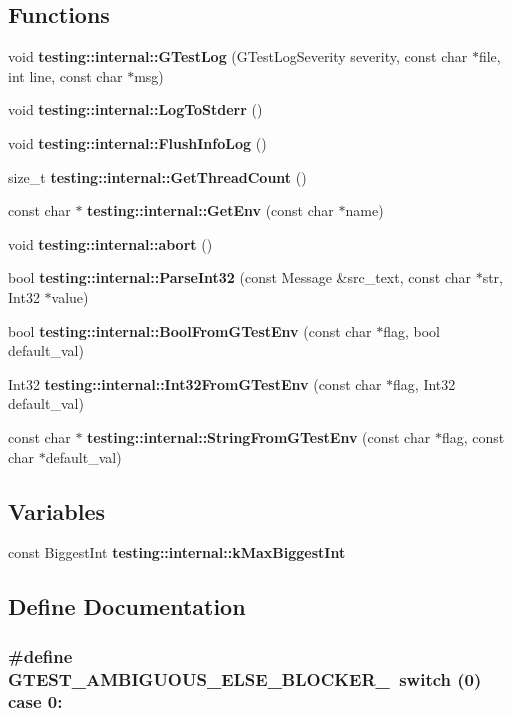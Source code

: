 \subsection*{Functions}
\begin{CompactItemize}
\item 
void {\bf testing::internal::GTestLog} (GTestLogSeverity severity, const char $\ast$file, int line, const char $\ast$msg)
\item 
void {\bf testing::internal::LogToStderr} ()
\item 
void {\bf testing::internal::FlushInfoLog} ()
\item 
size\_\-t {\bf testing::internal::GetThreadCount} ()
\item 
const char $\ast$ {\bf testing::internal::GetEnv} (const char $\ast$name)
\item 
void {\bf testing::internal::abort} ()
\item 
bool {\bf testing::internal::ParseInt32} (const Message \&src\_\-text, const char $\ast$str, Int32 $\ast$value)
\item 
bool {\bf testing::internal::BoolFromGTestEnv} (const char $\ast$flag, bool default\_\-val)
\item 
Int32 {\bf testing::internal::Int32FromGTestEnv} (const char $\ast$flag, Int32 default\_\-val)
\item 
const char $\ast$ {\bf testing::internal::StringFromGTestEnv} (const char $\ast$flag, const char $\ast$default\_\-val)
\end{CompactItemize}
\subsection*{Variables}
\begin{CompactItemize}
\item 
const BiggestInt {\bf testing::internal::kMaxBiggestInt}
\end{CompactItemize}


\subsection{Define Documentation}
\subsubsection{\setlength{\rightskip}{0pt plus 5cm}\#define GTEST\_\-AMBIGUOUS\_\-ELSE\_\-BLOCKER\_\-~switch (0) case 0:}\label{gtest-port_8h_fef9217bc28183f8b5a0c0341dc0e9ce}


